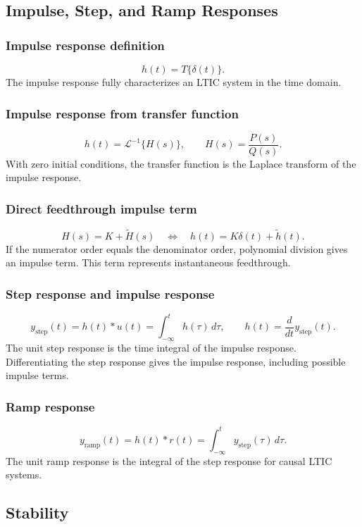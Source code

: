 \subsection{Impulse, Step, and Ramp Responses}

\subsubsection{Impulse response definition}
\[
h(t)=T\{\delta(t)\}.
\]
The impulse response fully characterizes an LTIC system in the time domain.

\subsubsection{Impulse response from transfer function}
\[
h(t)=\mathcal{L}^{-1}\{H(s)\}, \qquad
H(s)=\frac{P(s)}{Q(s)}.
\]
With zero initial conditions, the transfer function is the Laplace transform of the impulse response.

\subsubsection{Direct feedthrough impulse term}
\[
H(s)=K+\widetilde{H}(s)
\quad \Longleftrightarrow \quad
h(t)=K\delta(t)+\widetilde{h}(t).
\]
If the numerator order equals the denominator order, polynomial division gives an impulse term. This term represents instantaneous feedthrough.

\subsubsection{Step response and impulse response}
\[
y_{\mathrm{step}}(t)=h(t)*u(t)=\int_{-\infty}^{t}h(\tau)\,d\tau,
\qquad
h(t)=\frac{d}{dt}y_{\mathrm{step}}(t).
\]
The unit step response is the time integral of the impulse response. Differentiating the step response gives the impulse response, including possible impulse terms.

\subsubsection{Ramp response}
\[
y_{\mathrm{ramp}}(t)=h(t)*r(t)=\int_{-\infty}^{t}y_{\mathrm{step}}(\tau)\,d\tau.
\]
The unit ramp response is the integral of the step response for causal LTIC systems.

\subsection{Stability}

